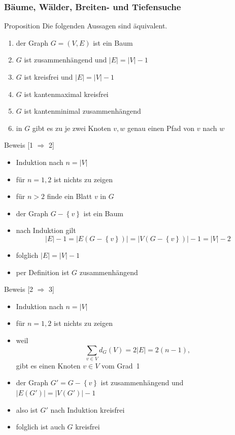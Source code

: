 \documentclass[aspectratio=1610, 11pt]{beamer}
\newcommand\cbc[1]{\left\{{#1}\right\}}
\newcommand{\mytitle}{B\"aume, W\"alder, Breiten- und Tiefensuche}
\begin{document}
\begin{frame}\frametitle{\mytitle}
	\begin{overprint}
		\begin{block}{Proposition}
			Die folgenden Aussagen sind \"aquivalent.
			\begin{enumerate}
				\item der Graph $G=(V,E)$ ist ein Baum
				\item $G$ ist zusammenh\"angend und $|E|=|V|-1$
				\item $G$ ist kreisfrei und $|E|=|V|-1$
				\item $G$ ist kantenmaximal kreisfrei
				\item $G$ ist kantenminimal zusammenh\"angend
				\item in $G$ gibt es zu je zwei Knoten $v,w$ genau einen Pfad von $v$ nach $w$
			\end{enumerate}
		\end{block}
		\begin{exampleblock}{Beweis \hfill[1 $\Rightarrow$ 2]}
			\begin{itemize}
				\item Induktion nach $n=|V|$
				\item f\"ur $n=1,2$ ist nichts zu zeigen
				\item f\"ur $n>2$ finde ein Blatt $v$ in $G$
				\item der Graph $G-\cbc v$ ist ein Baum
				\item nach Induktion gilt $$|E|-1=|E(G-\cbc v)|=|V(G-\cbc v)|-1=|V|-2$$
				\item folglich $|E|=|V|-1$
				\item per Definition ist $G$ zusammenh\"angend
			\end{itemize}
		\end{exampleblock}
		\begin{exampleblock}{Beweis \hfill[2 $\Rightarrow$ 3]}
			\begin{itemize}
				\item Induktion nach $n=|V|$
				\item f\"ur $n=1,2$ ist nichts zu zeigen
				\item weil $$\sum_{v\in V}d_G(V)=2|E|=2(n-1),$$ gibt es einen Knoten $v\in V$ vom Grad~1
				\item der Graph $G'=G-\cbc v$ ist zusammenh\"angend und $|E(G')|=|V(G')|-1$
				\item also ist $G'$ nach Induktion kreisfrei
				\item folglich ist auch $G$ kreisfrei

\end{itemize}
\end{exampleblock}
\end{overprint}
\end{frame}
\end{document}
